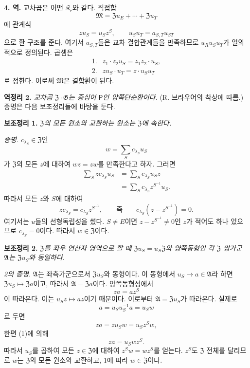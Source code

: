 \noindent\textbf{4. 역.} 교차곱은 어떤 \(\mathfrak K_r\)와 같다. 직접합
\[
        \mathfrak M
        =\mathfrak Zu_E+\cdots+\mathfrak Zu_T
\]
에 관계식
\[
        zu_S=u_Sz^S,
        \qquad
        u_Su_T=a_{S,T}u_{ST}
\]
으로 환 구조를 준다. 여기서 \(a_{S,T}\)들은 교차 결합관계들을 만족하므로 \(u_Ru_Su_T\)가 일의적으로 정의된다. 곱셈은
\[
\begin{array}{ll}
1.&z_1\mathbin{\cdot}z_2u_S=z_1z_2\mathbin{\cdot}u_S,\\[2pt]
2.&zu_S\mathbin{\cdot}u_T=z\mathbin{\cdot}u_Su_T
\end{array}
\]
로 정한다. 이로써 \(\mathfrak M\)은 결합환이 된다.

\noindent\textbf{역정리 2.} \emph{교차곱 \(\mathfrak Z\mathbin{\cdot}\mathfrak G\)는 중심이 \(\mathsf P\)인 양쪽단순환이다.} (R. 브라우어의 착상에 따름.) 증명은 다음 보조정리들에 바탕을 둔다.

\noindent\textbf{보조정리 1.} \emph{\(\mathfrak Z\)의 모든 원소와 교환하는 원소는 \(\mathfrak Z\)에 속한다.}

\noindent\emph{증명.} \(c_{\lambda_S}\in\mathfrak Z\)인
\[
        w=\sum_Sc_{\lambda_S}u_S
\]
가 \(\mathfrak Z\)의 모든 \(z\)에 대하여 \(wz=zw\)를 만족한다고 하자. 그러면
\[
\begin{aligned}
\sum_Szc_{\lambda_S}u_S
 &=\sum_Sc_{\lambda_S}u_Sz\\
 &=\sum_Sc_{\lambda_S}z^{S^{-1}}u_S.
\end{aligned}
\]
따라서 모든 \(z\)와 \(S\)에 대하여
\[
        zc_{\lambda_S}=c_{\lambda_S}z^{S^{-1}},
        \qquad\text{즉}\qquad
        c_{\lambda_S}(z-z^{S^{-1}})=0.
\]
여기서는 \(u\)들의 선형독립성을 썼다. \(S\ne E\)이면 \(z-z^{S^{-1}}\ne0\)인 \(z\)가 적어도 하나 있으므로 \(c_{\lambda_S}=0\)이다. 따라서 \(w\in\mathfrak Z\)이다.

\noindent\textbf{보조정리 2.} \emph{\(\mathfrak Z\)를 좌우 연산자 영역으로 할 때 \(\mathfrak Zu_S=u_S\mathfrak Z\)와 양쪽동형인 각 \(\mathfrak Z\)-쌍가군 \(\mathfrak A\)는 \(\mathfrak Zu_S\)와 동일하다.}

\noindent\emph{2의 증명.} \(\mathfrak A\)는 좌측가군으로서 \(\mathfrak Zu_S\)와 동형이다. 이 동형에서 \(u_S\mapsto a\in\mathfrak A\)라 하면 \(\mathfrak Zu_S\mapsto\mathfrak Za\)이고, 따라서 \(\mathfrak A=\mathfrak Za\)이다. 양쪽동형성에서
\[
        za=az^S
        \tag{1}
\]
이 따라온다. 이는 \(u_Sz\mapsto az\)이기 때문이다. 이로부터 \(\mathfrak A=\mathfrak Zu_S\)가 따라온다. 실제로
\[
        a=u_Su_S^{-1}a=u_Sw
\]
로 두면
\[
        za=zu_Sw=u_Sz^Sw,
\]
한편 (1)에 의해
\[
        za=u_Swz^S.
\]
따라서 \(u_S\)를 곱하여 모든 \(z\in\mathfrak Z\)에 대하여 \(z^Sw=wz^S\)를 얻는다. \(z^S\)도 \(\mathfrak Z\) 전체를 달리므로 \(w\)는 \(\mathfrak Z\)의 모든 원소와 교환하고, 1에 따라 \(w\in\mathfrak Z\)이다.

